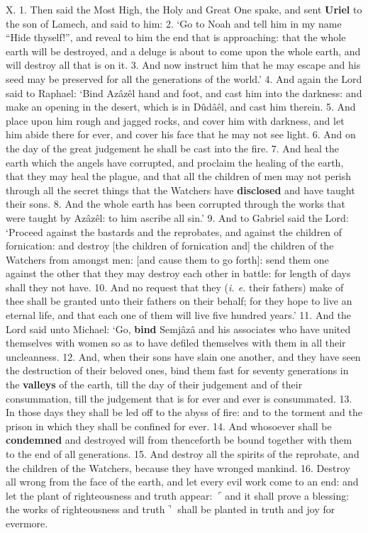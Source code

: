 X. 1. Then said the Most High, the Holy and
Great One spake, and sent \textbf{Uriel} to the son of Lamech,
and said to him: 2. ‘Go to Noah and tell him in
my name “Hide thyself!”, and reveal to him the
end that is approaching: that the whole earth will
be destroyed, and a deluge is about to come upon
the whole earth, and will destroy all that is on it.
3. And now instruct him that he may escape and his
seed may be preserved for all the generations of the
world.’ 4. And again the Lord said to Raphael:
‘Bind Azâzêl hand and foot, and cast him into the
darkness: and make an opening in the desert, which
is in Dûdâêl, and cast him therein. 5. And place
upon him rough and jagged rocks, and cover him with
darkness, and let him abide there for ever, and cover
his face that he may not see light. 6. And on the
day of the great judgement he shall be cast into the
fire. 7. And heal the earth which the angels have
corrupted, and proclaim the healing of the earth,
that they may heal the plague, and that all the
children of men may not perish through all the
secret things that the Watchers have \textbf{disclosed} and
have taught their sons. 8. And the whole earth has
been corrupted through the works that were taught
by Azâzêl: to him ascribe all sin.’ 9. And to Gabriel
said the Lord: ‘Proceed against the bastards and
the reprobates, and against the children of fornication:
and destroy [the children of fornication and]
the children of the Watchers from amongst men:
[and cause them to go forth]: send them one against
the other that they may destroy each other in battle:
for length of days shall they not have. 10. And no
request that they (\emph{i. e.} their fathers) make of thee
shall be granted unto their fathers on their behalf;
for they hope to live an eternal life, and that each
one of them will live five hundred years.’ 11. And
the Lord said unto Michael: ‘Go, \textbf{bind} Semjâzâ and
his associates who have united themselves with
women so as to have defiled themselves with them
in all their uncleanness. 12. And, when their sons
have slain one another, and they have seen the destruction
of their beloved ones, bind them fast for
seventy generations in the \textbf{valleys} of the earth, till
the day of their judgement and of their consummation,
till the judgement that is for ever and ever is
consummated. 13. In those days they shall be led
off to the abyss of fire: and to the torment and
the prison in which they shall be confined for ever.
14. And whosoever shall be \textbf{condemned} and destroyed
will from thenceforth be bound together with
them to the end of all generations. 15. And destroy
all the spirits of the reprobate, and the children of
the Watchers, because they have wronged mankind.
16. Destroy all wrong from the face of the earth, and
let every evil work come to an end: and let the plant
of righteousness and truth appear: $\ulcorner$and it shall
prove a blessing: the works of righteousness and
truth$\urcorner$ shall be planted in truth and joy for evermore.

